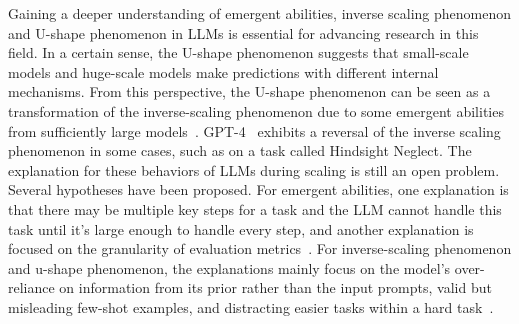 \documentclass[manuscript,screen, nonacm]{acmart}
\begin{document}
Gaining a deeper understanding of emergent abilities, inverse scaling phenomenon and U-shape phenomenon in LLMs is essential for advancing research in this field. In a certain sense, the U-shape phenomenon suggests that small-scale models and huge-scale models make predictions with different internal mechanisms. From this perspective, the U-shape phenomenon can be seen as a transformation of the inverse-scaling phenomenon due to some emergent abilities from sufficiently large models~\cite{wei2022inverse}. GPT-4~\cite{openai2023gpt4} exhibits a reversal of the inverse scaling phenomenon in some cases, such as on a task called Hindsight Neglect. The explanation for these behaviors of LLMs during scaling is still an open problem. Several hypotheses have been proposed. For emergent abilities, one explanation is that there may be multiple key steps for a task and the LLM cannot handle this task until it's large enough to handle every step, and another explanation is focused on the granularity of evaluation metrics~\cite{wei2022emergent}. For inverse-scaling phenomenon and u-shape phenomenon, the explanations mainly focus on the model's over-reliance on information from its prior rather than the input prompts, valid but misleading few-shot examples, and distracting easier tasks within a hard task~\cite{wei2022inverse}. 






































    




    
\end{document}
